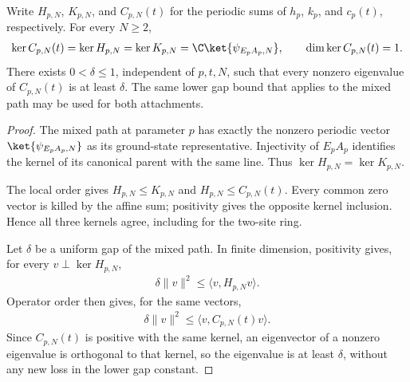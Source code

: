 \begin{theorem}
    \label{thm:mpo_arbitrary_endpoint_attachment_gap}
    \leanok
    Write $H_{p,N}$, $K_{p,N}$, and $C_{p,N}(t)$ for the periodic sums
    of $h_p$, $k_p$, and $c_p(t)$, respectively. For every $N\geq2$,
    \begin{align}
        \ker C_{p,N}(t)=\ker H_{p,N}=\ker K_{p,N}
        =\C\ket{\psi_{E_pA_p,N}},
        \qquad \dim\ker C_{p,N}(t)=1.
    \end{align}
    There exists $0<\delta\leq1$, independent of $p,t,N$, such that
    every nonzero eigenvalue of $C_{p,N}(t)$ is at least $\delta$.
    The same lower gap bound that applies to the mixed path may be used
    for both attachments.
\end{theorem}
\begin{proof}
    \leanok
    The mixed path at parameter $p$ has exactly the nonzero periodic vector
    $\ket{\psi_{E_pA_p,N}}$ as its ground-state representative. Injectivity
    of $E_pA_p$ identifies the kernel of its canonical parent with the same
    line. Thus $\ker H_{p,N}=\ker K_{p,N}$.

    The local order gives $H_{p,N}\leq K_{p,N}$ and
    $H_{p,N}\leq C_{p,N}(t)$. Every common zero vector is killed by the
    affine sum; positivity gives the opposite kernel inclusion. Hence all
    three kernels agree, including for the two-site ring.

    Let $\delta$ be a uniform gap of the mixed path. In finite
    dimension, positivity gives, for every $v\perp\ker H_{p,N}$,
    \begin{align}
        \delta\|v\|^2\leq\langle v,H_{p,N}v\rangle.
    \end{align}
    Operator order then gives, for the same vectors,
    \begin{align}
        \delta\|v\|^2\leq\langle v,C_{p,N}(t)v\rangle.
    \end{align}
    Since $C_{p,N}(t)$ is positive with the same kernel, an eigenvector of
    a nonzero eigenvalue is orthogonal to that kernel, so the eigenvalue is
    at least $\delta$, without any new loss in the lower gap constant.
\end{proof}

